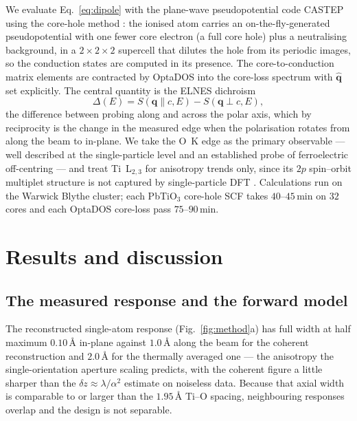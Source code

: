 \documentclass[aps,prb,twocolumn,superscriptaddress,floatfix,nofootinbib]{revtex4-2}
\begin{document}
We evaluate Eq.~\eqref{eq:dipole} with the plane-wave pseudopotential code CASTEP
\citep{Clark2005} using the core-hole method \citep{Gao2008}: the ionised atom carries an
on-the-fly-generated pseudopotential with one fewer core electron (a full core hole) plus a
neutralising background, in a $2\times2\times2$ supercell that dilutes the hole from its
periodic images, so the conduction states are computed in its presence. The core-to-conduction
matrix elements are contracted by OptaDOS \citep{Morris2014,Nicholls2012} into the core-loss
spectrum with $\hat{\mathbf{q}}$ set explicitly. The central quantity is the ELNES dichroism
\begin{equation}
  \Delta(E) = S(\mathbf{q}\!\parallel\!c,E) - S(\mathbf{q}\!\perp\!c,E),
  \label{eq:dichroism}
\end{equation}
the difference between probing along and across the polar axis, which by reciprocity is the
change in the measured edge when the polarisation rotates from along the beam to in-plane. We
take the O~K edge as the primary observable --- well described at the single-particle level and
an established probe of ferroelectric off-centring \citep{TorresPardo2011,Bugnet2016} --- and
treat Ti~L$_{2,3}$ for anisotropy trends only, since its $2p$ spin--orbit multiplet structure is
not captured by single-particle DFT \citep{Mizoguchi2009}. Calculations run on the Warwick
Blythe cluster; each PbTiO$_3$ core-hole SCF takes $40$--$45$\,min on $32$ cores and each
OptaDOS core-loss pass $75$--$90$\,min.

\section{Results and discussion}

\subsection{The measured response and the forward model}
\label{sec:res-fwd}

The reconstructed single-atom response (Fig.~\ref{fig:method}a) has full width at half maximum
$0.10$\,\AA{} in-plane against $1.0$\,\AA{} along the beam for the coherent reconstruction
and $2.0$\,\AA{} for the thermally averaged one --- the anisotropy the single-orientation
aperture scaling predicts, with the coherent figure a little sharper than the
$\delta z\approx\lambda/\alpha^2$ estimate on noiseless data. Because that
axial width is comparable to or larger than the $1.95$\,\AA{} Ti--O spacing, neighbouring
responses overlap and the design is not separable.
\end{document}

